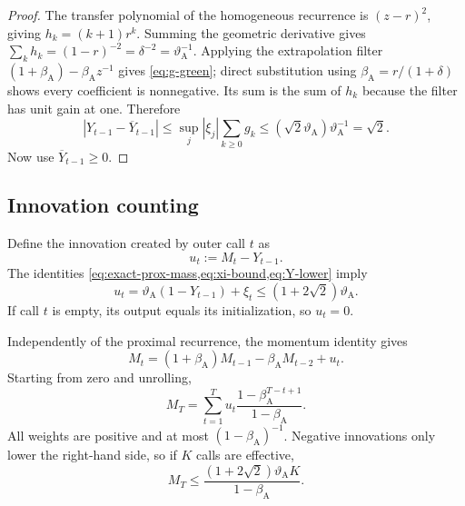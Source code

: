 \documentclass[11pt]{article}
\begin{document}
\begin{proof}
The transfer polynomial of the homogeneous recurrence is
$(z-r)^2$, giving $h_k=(k+1)r^k$.  Summing the geometric derivative gives
$\sum_k h_k=(1-r)^{-2}=\delta^{-2}=\vartheta_{\mathrm A}^{-1}$.  Applying the extrapolation
filter $(1+\beta_{\mathrm A})-\beta_{\mathrm A} z^{-1}$ gives \cref{eq:g-green}; direct substitution
using $\beta_{\mathrm A}=r/(1+\delta)$ shows every coefficient is nonnegative.  Its sum is
the sum of $h_k$ because the filter has unit gain at one.  Therefore
\[
  |Y_{t-1}-\overline Y_{t-1}|
  \leq \sup_j|\xi_j|\sum_{k\geq0}g_k
  \leq(\sqrt2 \vartheta_{\mathrm A})\vartheta_{\mathrm A}^{-1}=\sqrt2.
\]
Now use $\overline Y_{t-1}\geq0$.
\end{proof}

\subsection{Innovation counting}

Define the innovation created by outer call $t$ as
\begin{equation}
  u_t:=M_t-Y_{t-1}.
  \label{eq:innovation}
\end{equation}
The identities \cref{eq:exact-prox-mass,eq:xi-bound,eq:Y-lower} imply
\begin{equation}
  u_t=\vartheta_{\mathrm A}(1-Y_{t-1})+\xi_t
  \leq(1+2\sqrt2)\vartheta_{\mathrm A}.
  \label{eq:uniform-innovation}
\end{equation}
If call $t$ is empty, its output equals its initialization, so $u_t=0$.

Independently of the proximal recurrence, the momentum identity gives
\begin{equation}
  M_t=(1+\beta_{\mathrm A})M_{t-1}-\beta_{\mathrm A} M_{t-2}+u_t.
  \label{eq:innovation-recurrence}
\end{equation}
Starting from zero and unrolling,
\begin{equation}
  M_T
  =\sum_{t=1}^T
     u_t\frac{1-\beta_{\mathrm A}^{T-t+1}}{1-\beta_{\mathrm A}}.
  \label{eq:innovation-unroll}
\end{equation}
All weights are positive and at most $(1-\beta_{\mathrm A})^{-1}$.  Negative innovations
only lower the right-hand side, so if $K$ calls are effective,
\begin{equation}
  M_T\leq
  \frac{(1+2\sqrt2)\vartheta_{\mathrm A}K}{1-\beta_{\mathrm A}}.
  \label{eq:M-upper}
\end{equation}
\end{document}
